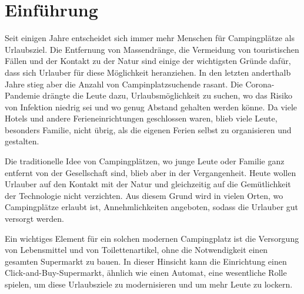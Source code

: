 \section{Einführung}


Seit einigen Jahre entscheidet sich immer mehr Menschen für Campingplätze als Urlaubsziel. 
Die Entfernung von Massendränge, die Vermeidung von touristischen Fällen und der Kontakt
zu der Natur sind einige der wichtigsten Gründe dafür, dass sich Urlauber für diese Möglichkeit
heranziehen. In den letzten anderthalb Jahre stieg aber die Anzahl von Campinplatzsuchende
rasant. Die Corona-Pandemie drängte die Leute dazu, Urlaubsmöglichkeit zu suchen, wo das
Risiko von Infektion niedrig sei und wo genug Abstand gehalten werden könne. Da viele Hotels
und andere Ferieneinrichtungen geschlossen waren, blieb viele Leute, besonders Familie, nicht 
übrig, als die eigenen Ferien selbst zu organisieren und gestalten.

Die traditionelle Idee von Campingplätzen, wo junge Leute oder Familie ganz entfernt von der
Gesellschaft sind, blieb aber in der Vergangenheit. Heute wollen Urlauber auf den Kontakt mit 
der Natur und gleichzeitig auf die Gemütlichkeit der Technologie nicht verzichten. Aus diesem
Grund wird in vielen Orten, wo Campingplätze erlaubt ist, Annehmlichkeiten angeboten, sodass 
die Urlauber gut versorgt werden.

Ein wichtiges Element für ein solchen modernen Campingplatz ist die Versorgung von Lebensmittel 
und von Toilettenartikel, ohne die Notwendigkeit einen gesamten Supermarkt zu bauen. In dieser 
Hinsicht kann die Einrichtung einen Click-and-Buy-Supermarkt, ähnlich wie einen Automat, eine 
wesentliche Rolle spielen, um diese Urlaubsziele zu modernisieren und um mehr Leute zu lockern.

